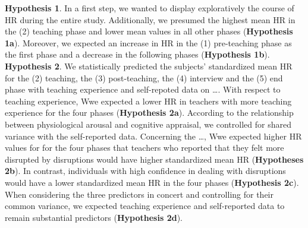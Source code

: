 \documentclass[preprint, 3p,
authoryear]{elsarticle} %
\begin{document}
\textbf{Hypothesis 1}. In a first step, we wanted to display
exploratively the course of HR during the entire study. Additionally, we
presumed the highest mean HR in the (2) teaching phase and lower mean
values in all other phases (\textbf{Hypothesis 1a}). Moreover, we
expected an increase in HR in the (1) pre-teaching phase as the first
phase and a decrease in the following phases (\textbf{Hypothesis 1b}).
\textbf{Hypothesis 2}. We statistically predicted the subjects'
standardized mean HR for the (2) teaching, the (3) post-teaching, the
(4) interview and the (5) end phase with teaching experience and
self-repoted data on \ldots. With respect to teaching experience, Wwe
expected a lower HR in teachers with more teaching experience for the
four phases (\textbf{Hypothesis 2a}). According to the relationship
between physiological arousal and cognitive appraisal, we controlled for
shared variance with the self-reported data. Concerning the \ldots, Wwe
expected higher HR values for for the four phases that teachers who
reported that they felt more disrupted by disruptions would have higher
standardized mean HR (\textbf{Hypotheses 2b}). In contrast, individuals
with high confidence in dealing with disruptions would have a lower
standardized mean HR in the four phases (\textbf{Hypothesis 2c}). When
considering the three predictors in concert and controlling for their
common variance, we expected teaching experience and self-reported data
to remain substantial predictors (\textbf{Hypothesis 2d}).

\renewcommand\refname{References}

\end{document}
